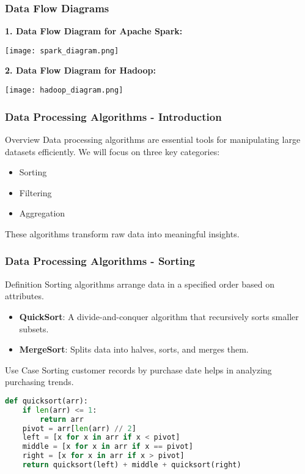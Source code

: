 \documentclass[aspectratio=169]{beamer}
\begin{document}
\begin{frame}[fragile]
    \frametitle{Data Flow Diagrams}
    \textbf{1. Data Flow Diagram for Apache Spark:}
    \begin{center}
        \texttt{[image: spark\_diagram.png]} %
    \end{center}

    \textbf{2. Data Flow Diagram for Hadoop:}
    \begin{center}
        \texttt{[image: hadoop\_diagram.png]} %
    \end{center}
\end{frame}

\begin{frame}[fragile]
    \frametitle{Data Processing Algorithms - Introduction}
    \begin{block}{Overview}
        Data processing algorithms are essential tools for manipulating large datasets efficiently. We will focus on three key categories:
    \end{block}
    \begin{itemize}
        \item Sorting
        \item Filtering
        \item Aggregation
    \end{itemize}
    These algorithms transform raw data into meaningful insights.
\end{frame}

\begin{frame}[fragile]
    \frametitle{Data Processing Algorithms - Sorting}
    \begin{block}{Definition}
        Sorting algorithms arrange data in a specified order based on attributes.
    \end{block}
    \begin{itemize}
        \item \textbf{QuickSort}: A divide-and-conquer algorithm that recursively sorts smaller subsets.
        \item \textbf{MergeSort}: Splits data into halves, sorts, and merges them.
    \end{itemize}
    \begin{block}{Use Case}
        Sorting customer records by purchase date helps in analyzing purchasing trends.
    \end{block}
    \begin{lstlisting}[language=Python]
def quicksort(arr):
    if len(arr) <= 1:
        return arr
    pivot = arr[len(arr) // 2]
    left = [x for x in arr if x < pivot]
    middle = [x for x in arr if x == pivot]
    right = [x for x in arr if x > pivot]
    return quicksort(left) + middle + quicksort(right)
    \end{lstlisting}
\end{frame}
\end{document}
